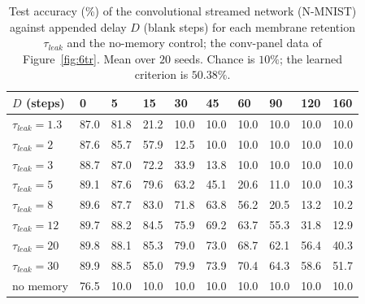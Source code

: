 \begin{table}[H]
    \caption[Source data: convolutional retention curves (Fig.~\ref{fig:6tr}b).]{Test
    accuracy (\%) of the convolutional streamed network (N-MNIST) against appended delay
    $D$ (blank steps) for each membrane retention $\tau_{leak}$ and the no-memory
    control; the conv-panel data of Figure~\ref{fig:6tr}. Mean over $20$ seeds. Chance is
    $10\%$; the learned criterion is $50.38\%$.}
    \begin{center}
    \footnotesize
    \begin{tabularx}{\textwidth}{@{}l *{9}{Y}@{}}
    \toprule
    $D$ (steps) & 0 & 5 & 15 & 30 & 45 & 60 & 90 & 120 & 160 \\
    \midrule
    $\tau_{leak}{=}1.3$ & 87.0 & 81.8 & 21.2 & 10.0 & 10.0 & 10.0 & 10.0 & 10.0 & 10.0 \\
    $\tau_{leak}{=}2$   & 87.6 & 85.7 & 57.9 & 12.5 & 10.0 & 10.0 & 10.0 & 10.0 & 10.0 \\
    $\tau_{leak}{=}3$   & 88.7 & 87.0 & 72.2 & 33.9 & 13.8 & 10.0 & 10.0 & 10.0 & 10.0 \\
    $\tau_{leak}{=}5$   & 89.1 & 87.6 & 79.6 & 63.2 & 45.1 & 20.6 & 11.0 & 10.0 & 10.3 \\
    $\tau_{leak}{=}8$   & 89.6 & 87.7 & 83.0 & 71.8 & 63.8 & 56.2 & 20.5 & 13.2 & 10.2 \\
    $\tau_{leak}{=}12$  & 89.7 & 88.2 & 84.5 & 75.9 & 69.2 & 63.7 & 55.3 & 31.8 & 12.9 \\
    $\tau_{leak}{=}20$  & 89.8 & 88.1 & 85.3 & 79.0 & 73.0 & 68.7 & 62.1 & 56.4 & 40.3 \\
    $\tau_{leak}{=}30$  & 89.9 & 88.5 & 85.0 & 79.9 & 73.9 & 70.4 & 64.3 & 58.6 & 51.7 \\
    no memory           & 76.5 & 10.0 & 10.0 & 10.0 & 10.0 & 10.0 & 10.0 & 10.0 & 10.0 \\
    \bottomrule
    \end{tabularx}
    \label{table:E13}
    \end{center}
    \vspace*{-\baselineskip}
\end{table}

